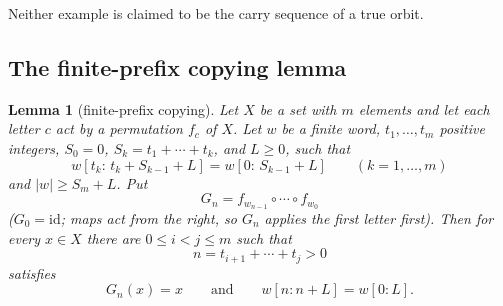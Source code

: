 \documentclass[11pt,reqno]{amsart}
\newtheorem{lemma}[theorem]{Lemma}
\theoremstyle{definition}
\theoremstyle{remark}
\begin{document}
Neither example is claimed to be the carry sequence of a true orbit.

\subsection{The finite-prefix copying lemma}\label{sec:B.2}

\begin{samepage}
\begin{lemma}[finite-prefix copying]\leavevmode\label{thm:49}
Let \(X\) be a set with \(m\)
elements and let each letter \(c\) act by a permutation \(f_c\) of
\(X\). Let \(w\) be a finite word, \(t_1,\ldots,t_m\) positive integers,
\(S_0=0\), \(S_k=t_1+\cdots+t_k\), and \(L\ge0\), such that
\[
w[t_k:\,t_k+S_{k-1}+L]=w[0:\,S_{k-1}+L]\qquad(k=1,\ldots,m)
\tag{31}\label{eq:31}
\]
and \(|w|\ge S_m+L\). Put
\[
G_n=f_{w_{n-1}}\circ\cdots\circ f_{w_0}
\]
(\(G_0=\mathrm{id}\); maps act from the right, so \(G_n\) applies the
first letter first). Then for every \(x\in X\) there are
\(0\le i<j\le m\) such that
\[
n=t_{i+1}+\cdots+t_j>0
\]
satisfies
\[
G_n(x)=x\qquad \text{and}\qquad w[n:n+L]=w[0:L].
\]
\label{thm-end:49}
\end{lemma}
\end{samepage}
\end{document}
